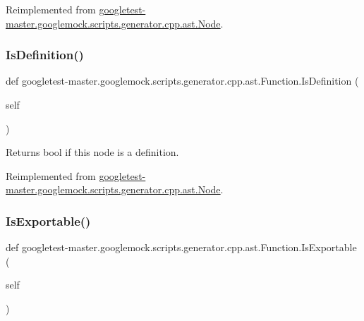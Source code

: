 Reimplemented from \mbox{\hyperlink{classgoogletest-master_1_1googlemock_1_1scripts_1_1generator_1_1cpp_1_1ast_1_1_node_ac675d48443725155c9e5a16a4079a163}{googletest-\/master.\+googlemock.\+scripts.\+generator.\+cpp.\+ast.\+Node}}.

\mbox{\label{classgoogletest-master_1_1googlemock_1_1scripts_1_1generator_1_1cpp_1_1ast_1_1_function_a1344d79b1122eb8fe60e455deb03d83e}} 
\subsubsection{\texorpdfstring{IsDefinition()}{IsDefinition()}}
{\footnotesize\ttfamily def googletest-\/master.\+googlemock.\+scripts.\+generator.\+cpp.\+ast.\+Function.\+Is\+Definition (\begin{DoxyParamCaption}\item[{}]{self }\end{DoxyParamCaption})}

\begin{DoxyVerb}Returns bool if this node is a definition.\end{DoxyVerb}
 

Reimplemented from \mbox{\hyperlink{classgoogletest-master_1_1googlemock_1_1scripts_1_1generator_1_1cpp_1_1ast_1_1_node_a3a3edec9cd30222cfea1295005abadd3}{googletest-\/master.\+googlemock.\+scripts.\+generator.\+cpp.\+ast.\+Node}}.

\mbox{\label{classgoogletest-master_1_1googlemock_1_1scripts_1_1generator_1_1cpp_1_1ast_1_1_function_a41dc0bcce788576f9d71c0d49dcdb620}} 
\subsubsection{\texorpdfstring{IsExportable()}{IsExportable()}}
{\footnotesize\ttfamily def googletest-\/master.\+googlemock.\+scripts.\+generator.\+cpp.\+ast.\+Function.\+Is\+Exportable (\begin{DoxyParamCaption}\item[{}]{self }\end{DoxyParamCaption})}

